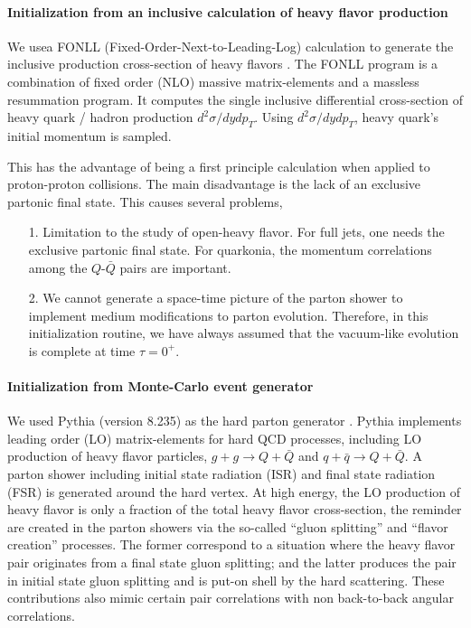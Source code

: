 \paragraph{Initialization from an inclusive calculation of heavy flavor production}
We usea  FONLL (Fixed-Order-Next-to-Leading-Log) calculation to generate the inclusive production cross-section of heavy flavors \cite{Cacciari:1998it}.
The FONLL program is a combination of fixed order (NLO) massive matrix-elements and a massless resummation program.
It computes the single inclusive differential cross-section of heavy quark / hadron production $d^2\sigma/dydp_T$.
Using $d^2\sigma/dydp_T$, heavy quark's initial momentum is sampled.

This has the advantage of being a first principle calculation when applied to proton-proton collisions. 
The main disadvantage is the lack of an exclusive partonic final state.
This causes several problems,
\begin{itemize}
\item[1.] Limitation to the study of open-heavy flavor.
For full jets, one needs the exclusive partonic final state. For quarkonia, the momentum correlations among the $Q$-$\bar{Q}$ pairs are important.
\item[2.] We cannot generate a space-time picture of the parton shower to implement medium modifications to parton evolution. 
Therefore, in this initialization routine, we have always assumed that the vacuum-like evolution is complete at time $\tau=0^{+}$.
\end{itemize}

\paragraph{Initialization from Monte-Carlo event generator}
We used Pythia (version 8.235) as the hard parton generator \cite{Sjostrand:2014zea, Sjostrand:2006za}.
Pythia implements leading order (LO) matrix-elements for hard QCD processes, including LO production of heavy flavor particles,
$g+g\rightarrow Q+\bar{Q}$ and $q+\bar{q}\rightarrow Q+\bar{Q}$.
A parton shower including initial state radiation (ISR) and final state radiation (FSR) is generated around the hard vertex.
At high energy, the LO production of heavy flavor is only a fraction of the total heavy flavor cross-section, the reminder are created in the parton showers via the so-called ``gluon splitting'' and ``flavor creation'' processes.
The former correspond to a situation where the heavy flavor pair originates from a final state gluon splitting; and the latter produces the pair in initial state gluon splitting and is put-on shell by the hard scattering.
These contributions also mimic certain pair correlations with non back-to-back angular correlations.

